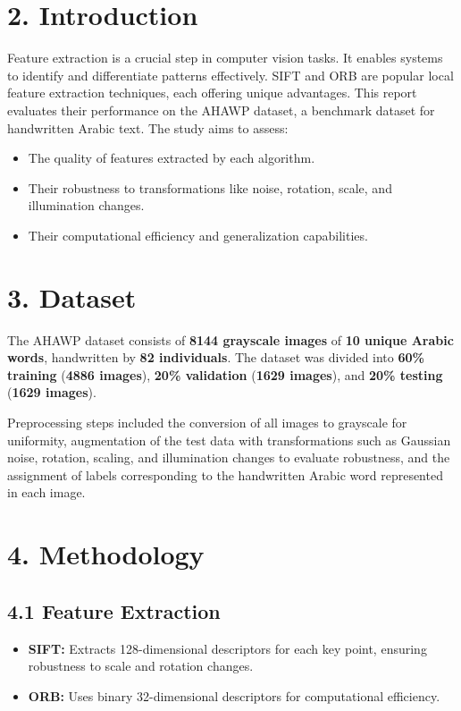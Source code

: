 \documentclass[12pt]{article}
\begin{document}
\section*{2. Introduction}
Feature extraction is a crucial step in computer vision tasks. It enables systems to identify and differentiate patterns effectively. SIFT and ORB are popular local feature extraction techniques, each offering unique advantages. This report evaluates their performance on the AHAWP dataset, a benchmark dataset for handwritten Arabic text. The study aims to assess:
\begin{itemize}
    \item The quality of features extracted by each algorithm.
    \item Their robustness to transformations like noise, rotation, scale, and illumination changes.
    \item Their computational efficiency and generalization capabilities.
\end{itemize}
\section*{3. Dataset}

The AHAWP dataset consists of \textbf{8144 grayscale images} of \textbf{10 unique Arabic words}, handwritten by \textbf{82 individuals}. The dataset was divided into \textbf{60\% training} (\textbf{4886 images}), \textbf{20\% validation} (\textbf{1629 images}), and \textbf{20\% testing} (\textbf{1629 images}).

Preprocessing steps included the conversion of all images to grayscale for uniformity, augmentation of the test data with transformations such as Gaussian noise, rotation, scaling, and illumination changes to evaluate robustness, and the assignment of labels corresponding to the handwritten Arabic word represented in each image.

\section*{4. Methodology}

\subsection*{4.1 Feature Extraction}
\begin{itemize}
    \item \textbf{SIFT:} Extracts 128-dimensional descriptors for each key point, ensuring robustness to scale and rotation changes.
    \item \textbf{ORB:} Uses binary 32-dimensional descriptors for computational efficiency.
\end{itemize}
\end{document}
